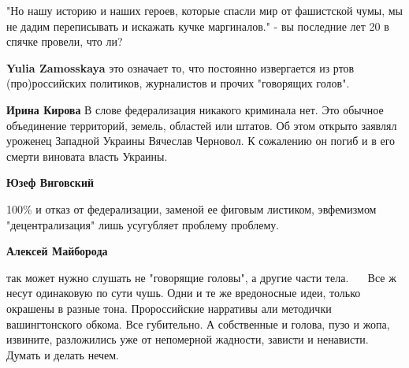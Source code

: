 \begin{itemize}
"Но нашу историю и наших героев, которые спасли мир от фашистской чумы, мы не
дадим переписывать и искажать кучке маргиналов." - вы последние лет 20 в спячке
провели, что ли?

 
\textbf{Yulia Zamosskaya} это означает то, что постоянно извергается из ртов (про)российских политиков, журналистов и прочих "говорящих голов".

 
\textbf{Ирина Кирова} В слове федерализация никакого криминала нет. Это обычное
объединение территорий, земель, областей или штатов. Об этом открыто заявлял
уроженец Западной Украины Вячеслав Черновол. К сожалению он погиб и в его
смерти виновата власть Украины.

 
\textbf{Юзеф Виговский} 

100\% и отказ от федерализации, заменой ее фиговым
листиком, эвфемизмом "децентрализация" лишь усугубляет проблему проблему.

 
\textbf{Алексей Майборода} 

так может нужно слушать не "говорящие головы", а
другие части тела.🤣🤣🤣🤣🤣 Все ж несут одинаковую по сути чушь. Одни и те же
вредоносные идеи, только окрашены в разные тона. Пророссийские нарративы али
методички вашингтонского обкома. Все губительно. А собственные и голова, пузо и
жопа, извините, разложились уже от непомерной жадности, зависти и ненависти.
Думать и делать нечем.



\end{itemize}
